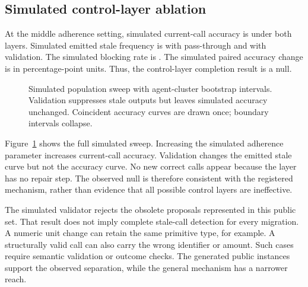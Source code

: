 \documentclass{article}
\begin{document}
\subsection{Simulated control-layer ablation}
At the middle adherence setting, simulated current-call accuracy is \SimAccuracy{} under both layers. Simulated emitted stale frequency is \SimStaleBefore{} with pass-through and \SimStaleAfter{} with validation. The simulated blocking rate is \SimBlocked{}. The simulated paired accuracy change is \SimDifference{} in percentage-point units. Thus, the control-layer completion result is a null.\par
\begin{figure}[t]\centering{}\caption{Simulated population sweep with agent-cluster bootstrap intervals. Validation suppresses stale outputs but leaves simulated accuracy unchanged. Coincident accuracy curves are drawn once; boundary intervals collapse.}\label{fig:simulation}\end{figure}
Figure~\ref{fig:simulation} shows the full simulated sweep. Increasing the simulated adherence parameter increases current-call accuracy. Validation changes the emitted stale curve but not the accuracy curve. No new correct calls appear because the layer has no repair step. The observed null is therefore consistent with the registered mechanism, rather than evidence that all possible control layers are ineffective.\par
The simulated validator rejects the obsolete proposals represented in this public set. That result does not imply complete stale-call detection for every migration. A numeric unit change can retain the same primitive type, for example. A structurally valid call can also carry the wrong identifier or amount. Such cases require semantic validation or outcome checks. The generated public instances support the observed separation, while the general mechanism has a narrower reach.\par
\end{document}
